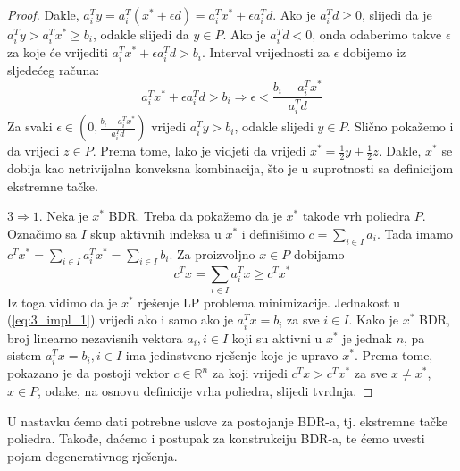 \documentclass[a4paper, utf8, 11pt, colorlinks]{book}
\theoremstyle{definition}
\begin{document}
\begin{proof}
       Dakle, $a_i^T y = a_i^T (x^* + \epsilon d) = a_i^T x^* + \epsilon a_i^T d $. Ako je $a_i^T d \geq 0$, slijedi da je 
       $a_i^T y > a_i^Tx^* \geq b_i$, odakle slijedi da   $y \in  P$. Ako je $a_i^T d < 0$, onda odaberimo takve $\epsilon$ za koje će vrijediti $a_i^T x^* + \epsilon a_i^T d > b_i$. Interval   vrijednosti za $\epsilon$ dobijemo iz sljedećeg računa:
       $$ a_i^T x^* + \epsilon a_i^T d > b_i \Rightarrow \epsilon < \frac{b_i - a_i^T x^*}{a_i^T d}  $$
       Za svaki $\epsilon \in \left(0,  \frac{b_i - a_i^T x^*}{a_i^T d} \right)$ vrijedi $a_i^T y > b_i$, odakle slijedi $y \in P$. Slično pokažemo i da vrijedi $z \in P$. 
       Prema tome, lako je vidjeti da vrijedi $x^* = \frac{1}{2}y +\frac{1}{2} z$. Dakle, $x^*$ se dobija kao netrivijalna konveksna kombinacija, što je u suprotnosti sa definicijom ekstremne tačke. 
       
       $3 \Rightarrow 1$. Neka je $x^*$ BDR. Treba da pokažemo da je  $x^*$  takođe vrh poliedra $P$. Označimo sa $I$ skup aktivnih indeksa u $x^*$ i definišimo $c = \sum_{i \in I} a_i$.  Tada imamo 
       $ c^T x^* = \sum_{i \in I } a_i^T x^* = \sum_{i \in I} b_i$. Za proizvoljno $x \in P$ dobijamo
       \begin{equation}\label{eq:3_impl_1}
          c^T x = \sum_{i \in I} a_i^T x \geq c^T x^*  
       \end{equation}
     Iz toga vidimo da je $x^*$ rješenje LP problema minimizacije. Jednakost u (\ref{eq:3_impl_1}) vrijedi ako i samo ako je $a_i^T x = b_i$ za sve $i \in I$. Kako je $x^*$ BDR, broj linearno nezavisnih vektora $a_i, i \in I$ koji su  aktivni u $x^*$ je jednak $n$, pa sistem $a_i^T x = b_i, i \in I$ ima jedinstveno rješenje koje je upravo $x^*$. Prema tome, pokazano je da postoji vektor $c \in \mathbb{R}^n$ za koji vrijedi $c^T x > c^T x^*$ za sve $x \neq x^*$, $x \in P$, odake, na osnovu definicije vrha poliedra, slijedi tvrdnja. 
\end{proof}
U nastavku ćemo dati potrebne uslove za postojanje BDR-a, tj. 
 ekstremne tačke poliedra. Takođe, daćemo i postupak za konstrukciju BDR-a, te ćemo uvesti pojam degenerativnog rješenja.
\end{document}
